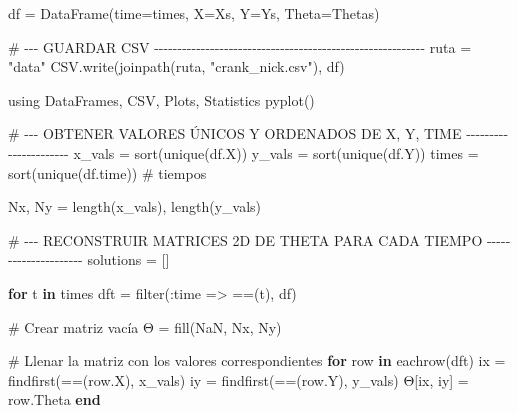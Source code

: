 \documentclass[
  spanish,
  us-letterpaper,
  DIV=11,
  numbers=noendperiod]{scrreprt}
\newenvironment{Shaded}{\begin{snugshade}}{\end{snugshade}}
\newcommand{\BuiltInTok}[1]{\textcolor[rgb]{0.00,0.23,0.31}{#1}}
\newcommand{\CommentTok}[1]{\textcolor[rgb]{0.37,0.37,0.37}{#1}}
\newcommand{\ConstantTok}[1]{\textcolor[rgb]{0.56,0.35,0.01}{#1}}
\newcommand{\ControlFlowTok}[1]{\textcolor[rgb]{0.00,0.23,0.31}{\textbf{#1}}}
\newcommand{\FunctionTok}[1]{\textcolor[rgb]{0.28,0.35,0.67}{#1}}
\newcommand{\ImportTok}[1]{\textcolor[rgb]{0.00,0.46,0.62}{#1}}
\newcommand{\KeywordTok}[1]{\textcolor[rgb]{0.00,0.23,0.31}{\textbf{#1}}}
\newcommand{\NormalTok}[1]{\textcolor[rgb]{0.00,0.23,0.31}{#1}}
\newcommand{\OperatorTok}[1]{\textcolor[rgb]{0.37,0.37,0.37}{#1}}
\newcommand{\StringTok}[1]{\textcolor[rgb]{0.13,0.47,0.30}{#1}}
\theoremstyle{plain}
\theoremstyle{definition}
\theoremstyle{remark}
\begin{document}
\begin{Shaded}
\begin{Highlighting}[]
\NormalTok{df }\OperatorTok{=} \FunctionTok{DataFrame}\NormalTok{(time}\OperatorTok{=}\NormalTok{times, X}\OperatorTok{=}\NormalTok{Xs, Y}\OperatorTok{=}\NormalTok{Ys, Theta}\OperatorTok{=}\NormalTok{Thetas)}

\CommentTok{\# {-}{-}{-} GUARDAR CSV {-}{-}{-}{-}{-}{-}{-}{-}{-}{-}{-}{-}{-}{-}{-}{-}{-}{-}{-}{-}{-}{-}{-}{-}{-}{-}{-}{-}{-}{-}{-}{-}{-}{-}{-}{-}{-}{-}{-}{-}{-}{-}{-}{-}{-}{-}{-}{-}{-}{-}{-}{-}{-}{-}{-}{-}{-}{-}}
\NormalTok{ruta }\OperatorTok{=} \StringTok{"data"}
\NormalTok{CSV.}\FunctionTok{write}\NormalTok{(}\FunctionTok{joinpath}\NormalTok{(ruta, }\StringTok{"crank\_nick.csv"}\NormalTok{), df)}
\end{Highlighting}
\end{Shaded}

\begin{Shaded}
\begin{Highlighting}[]
\ImportTok{using} \BuiltInTok{DataFrames}\NormalTok{, }\BuiltInTok{CSV}\NormalTok{, }\BuiltInTok{Plots}\NormalTok{, }\BuiltInTok{Statistics}
\FunctionTok{pyplot}\NormalTok{()}

\CommentTok{\# {-}{-}{-} OBTENER VALORES ÚNICOS Y ORDENADOS DE X, Y, TIME {-}{-}{-}{-}{-}{-}{-}{-}{-}{-}{-}{-}{-}{-}{-}{-}{-}{-}{-}{-}{-}{-}}
\NormalTok{x\_vals }\OperatorTok{=} \FunctionTok{sort}\NormalTok{(}\FunctionTok{unique}\NormalTok{(df.X))}
\NormalTok{y\_vals }\OperatorTok{=} \FunctionTok{sort}\NormalTok{(}\FunctionTok{unique}\NormalTok{(df.Y))}
\NormalTok{times }\OperatorTok{=} \FunctionTok{sort}\NormalTok{(}\FunctionTok{unique}\NormalTok{(df.time))  }\CommentTok{\# tiempos}

\NormalTok{Nx, Ny }\OperatorTok{=} \FunctionTok{length}\NormalTok{(x\_vals), }\FunctionTok{length}\NormalTok{(y\_vals)}

\CommentTok{\# {-}{-}{-} RECONSTRUIR MATRICES 2D DE THETA PARA CADA TIEMPO {-}{-}{-}{-}{-}{-}{-}{-}{-}{-}{-}{-}{-}{-}{-}{-}{-}{-}{-}{-}{-}}
\NormalTok{solutions }\OperatorTok{=}\NormalTok{ []}

\ControlFlowTok{for}\NormalTok{ t }\KeywordTok{in}\NormalTok{ times}
\NormalTok{    dft }\OperatorTok{=} \FunctionTok{filter}\NormalTok{(}\OperatorTok{:}\NormalTok{time }\OperatorTok{=\textgreater{}} \OperatorTok{==}\NormalTok{(t), df)}

    \CommentTok{\# Crear matriz vacía}
\NormalTok{    Θ }\OperatorTok{=} \FunctionTok{fill}\NormalTok{(}\ConstantTok{NaN}\NormalTok{, Nx, Ny)}

    \CommentTok{\# Llenar la matriz con los valores correspondientes}
    \ControlFlowTok{for}\NormalTok{ row }\KeywordTok{in} \FunctionTok{eachrow}\NormalTok{(dft)}
\NormalTok{        ix }\OperatorTok{=} \FunctionTok{findfirst}\NormalTok{(}\OperatorTok{==}\NormalTok{(row.X), x\_vals)}
\NormalTok{        iy }\OperatorTok{=} \FunctionTok{findfirst}\NormalTok{(}\OperatorTok{==}\NormalTok{(row.Y), y\_vals)}
\NormalTok{        Θ[ix, iy] }\OperatorTok{=}\NormalTok{ row.Theta}
    \ControlFlowTok{end}


\end{Highlighting}
\end{Shaded}
\end{document}

